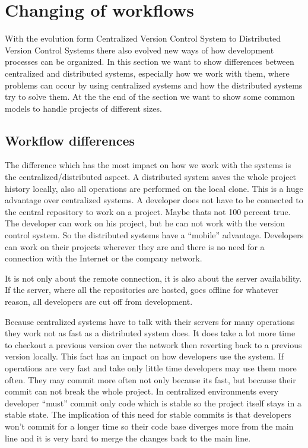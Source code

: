 \section{Changing of workflows} \label{changeofworkflows}

With the evolution form Centralized Version Control System to Distributed Version Control Systems there also 
evolved new ways of how development processes can be organized. In this section we want to show differences 
between centralized and distributed systems, especially how we work with them, where problems can occur by using 
centralized systems and how the distributed systems try to solve them. At the the end of the section we want 
to show some common models to handle projects of different sizes.

\subsection{Workflow differences}

The difference which has the most impact on how we work with the systems is the centralized/distributed aspect. 
A distributed system saves the whole project history locally, also all operations are performed on the local clone. 
This is a huge advantage over centralized systems. A developer does not have to be connected to the central 
repository to work on a project. Maybe thats not 100 percent true. The developer can work on his project, but 
he can not work with the version control system. So the distributed systems have a “mobile” advantage. 
Developers can work on their projects wherever they are and there is no need for a connection with the 
Internet or the company network.

It is not only about the remote connection, it is also about the server availability. If the server, where 
all the repositories are hosted, goes offline for whatever reason, all developers are cut off from development.

Because centralized systems have to talk with their servers for many operations they work not as fast as 
a distributed system does. It does take a lot more time to checkout a previous version over the network 
then reverting back to a previous version locally. This fact has an impact on how developers use the system. 
If operations are very fast and take only little time developers may use them more often. They may commit 
more often not only because its fast, but because their commit can not break the whole project. 
In centralized environments every developer “must” commit only code which is stable so the project 
itself stays in a stable state. The implication of this need for stable commits is that developers won't 
commit for a longer time so their code base diverges more from the main line and it is very hard 
to merge the changes back to the main line.

